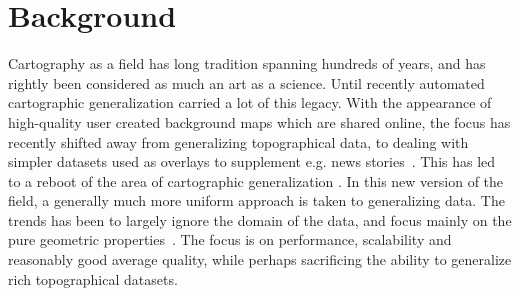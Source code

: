\section{Background}
Cartography as a field has long tradition spanning hundreds of years, and has rightly been considered as much an art as a science. Until recently automated cartographic generalization carried a lot of this legacy. With the appearance of high-quality user created background maps which are shared online, the focus has recently shifted away from generalizing topographical data, to dealing with simpler datasets used as overlays to supplement e.g. news stories~\cite{fusiontables,datajournalism}.  This has led to a reboot of the area of cartographic generalization \cite{fusiontables}. In this new version of the field, a generally much more uniform approach is taken to generalizing data. The trends has been to largely ignore the domain of the data, and focus mainly on the pure geometric properties~\cite{fusiontables}. The focus is on performance, scalability and reasonably good average quality, while perhaps sacrificing the ability to generalize rich topographical datasets.